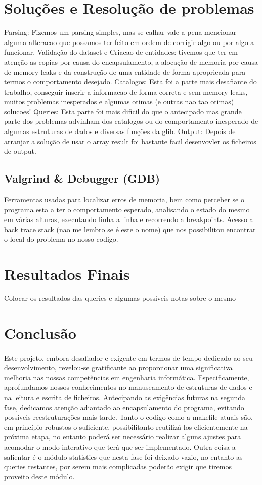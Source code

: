 \documentclass{article}
\begin{document}
\section{Soluções e Resolução de problemas}
Parsing: Fizemos um parsing simples, mas se calhar vale a pena mencionar alguma alteracao que possamos ter feito em ordem de corrigir algo ou por algo a funcionar.
Validação do dataset e Criacao de entidades: tivemos que ter em atenção as copias por causa do encapsulamento, a alocação de memoria por causa de memory leaks e da construção de uma entidade de forma aproprieada para termos o comportamento desejado.
Catalogos: Esta foi a parte mais desafiante do trabalho, conseguir inserir a informacao de forma correta e sem memory leaks, muitos problemas inesperados e algumas otimas (e outras nao tao otimas) solucoes!
Queries: Esta parte foi mais dificil do que o antecipado mas grande parte dos problemas advinham dos catalogos ou do comportamento inesperado de algumas estruturas de dados e diversas funções da glib. 
Output: Depois de arranjar a solução de usar o array result foi bastante facil desenvovler os ficheiros de output. 

\subsection{Valgrind & Debugger (GDB)}
Ferramentas usadas para localizar erros de memoria, bem como perceber se o programa esta a ter o comportamento esperado, analisando o estado do mesmo em várias alturas, executando linha a linha e recorrendo a breakpoints. Acesso a back trace stack (nao me lembro se é este o nome) que nos possibilitou encontrar o local do problema no nosso codigo.

\section{Resultados Finais}
Colocar os resultados das queries e algumas possiveis notas sobre o mesmo 
\section{Conclusão}
\paragraph{}Este projeto, embora desafiador e exigente em termos de tempo dedicado ao seu desenvolvimento, revelou-se gratificante ao proporcionar uma significativa melhoria nas nossas competências em engenharia informática. Especificamente, aprofundamos nossos conhecimentos no manuseamento de estruturas de dados e na leitura e escrita de ficheiros. Antecipando as exigências futuras na segunda fase, dedicamos atenção adiantado ao encapsulamento do programa, evitando possíveis reestruturações mais tarde. Tanto o codigo como a makefile atuais são, em princípio robustos o suficiente, possibilitanto reutilizá-los eficientemente na próxima etapa, no entanto poderá ser necessário realizar alguns ajustes para acomodar o modo interativo que terá que ser implementado. Outra coisa a salientar é o módulo statistics que nesta fase foi deixado vazio, no entanto as queries restantes, por serem mais complicadas poderão exigir que tiremos proveito deste módulo. 
\end{document}
